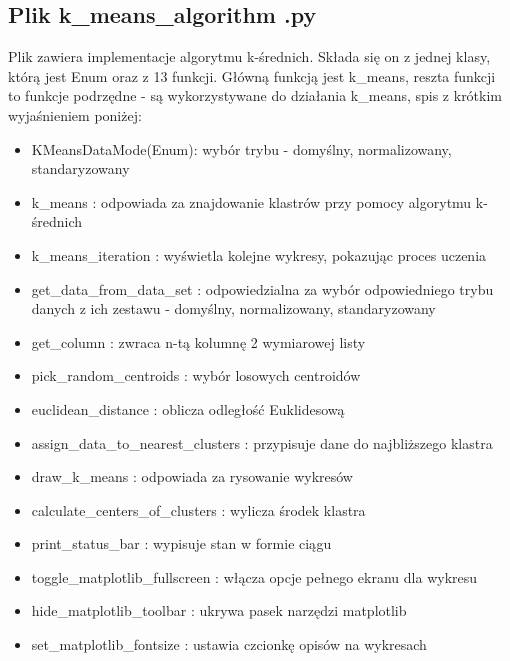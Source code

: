 \documentclass{classrep}
\begin{document}
{\subsection{Plik k\_means\_algorithm .py}
{
Plik zawiera implementacje algorytmu k-średnich. Składa się on z jednej klasy, którą jest Enum oraz z 13 funkcji.
Główną funkcją jest k\_means, reszta funkcji to funkcje podrzędne - są wykorzystywane do działania k\_means, spis
z krótkim wyjaśnieniem poniżej:
\begin{itemize}
\item KMeansDataMode(Enum): wybór trybu - domyślny, normalizowany, standaryzowany
\item k\_means : odpowiada za znajdowanie klastrów przy pomocy algorytmu k-średnich
\item k\_means\_iteration : wyświetla kolejne wykresy, pokazując proces uczenia
\item get\_data\_from\_data\_set : odpowiedzialna za wybór odpowiedniego trybu danych z ich zestawu - domyślny,
normalizowany, standaryzowany
\item get\_column : zwraca n-tą kolumnę 2 wymiarowej listy
\item pick\_random\_centroids : wybór losowych centroidów
\item euclidean\_distance : oblicza odległość Euklidesową
\item assign\_data\_to\_nearest\_clusters : przypisuje dane do najbliższego klastra
\item draw\_k\_means : odpowiada za rysowanie wykresów
\item calculate\_centers\_of\_clusters : wylicza środek klastra
\item print\_status\_bar : wypisuje stan w formie ciągu
\item toggle\_matplotlib\_fullscreen : włącza opcje pełnego ekranu dla wykresu
\item hide\_matplotlib\_toolbar : ukrywa pasek narzędzi matplotlib
\item set\_matplotlib\_fontsize : ustawia czcionkę opisów na wykresach
\end{itemize}
}
}
\end{document}
